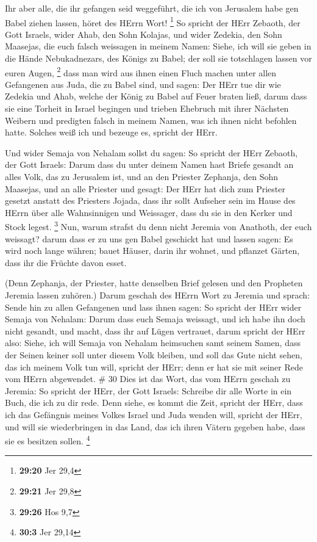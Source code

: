  Ihr aber alle, die ihr gefangen seid weggeführt, die ich
von Jerusalem habe gen Babel ziehen lassen, höret des HErrn Wort!
\footnote{\textbf{29:20} Jer 29,4}  So spricht der HErr
Zebaoth, der Gott Israels, wider Ahab, den Sohn Kolajas, und wider
Zedekia, den Sohn Maasejas, die euch falsch weissagen in meinem Namen:
Siehe, ich will sie geben in die Hände Nebukadnezars, des Königs zu
Babel; der soll sie totschlagen lassen vor euren Augen, \footnote{\textbf{29:21}
  Jer 29,8}  dass man wird aus ihnen einen Fluch machen
unter allen Gefangenen aus Juda, die zu Babel sind, und sagen: Der HErr
tue dir wie Zedekia und Ahab, welche der König zu Babel auf Feuer braten
ließ,  darum dass sie eine Torheit in Israel begingen und
trieben Ehebruch mit ihrer Nächsten Weibern und predigten falsch in
meinem Namen, was ich ihnen nicht befohlen hatte. Solches weiß ich und
bezeuge es, spricht der HErr.

 Und wider Semaja von Nehalam sollst du sagen:
 So spricht der HErr Zebaoth, der Gott Israels: Darum dass
du unter deinem Namen hast Briefe gesandt an alles Volk, das zu
Jerusalem ist, und an den Priester Zephanja, den Sohn Maasejas, und an
alle Priester und gesagt:  Der HErr hat dich zum Priester
gesetzt anstatt des Priesters Jojada, dass ihr sollt Aufseher sein im
Hause des HErrn über alle Wahnsinnigen und Weissager, dass du sie in den
Kerker und Stock legest. \footnote{\textbf{29:26} Hos 9,7} 
Nun, warum strafst du denn nicht Jeremia von Anathoth, der euch
weissagt?  darum dass er zu uns gen Babel geschickt hat und
lassen sagen: Es wird noch lange währen; bauet Häuser, darin ihr wohnet,
und pflanzet Gärten, dass ihr die Früchte davon esset.

 (Denn Zephanja, der Priester, hatte denselben Brief
gelesen und den Propheten Jeremia lassen zuhören.)  Darum
geschah des HErrn Wort zu Jeremia und sprach:  Sende hin zu
allen Gefangenen und lass ihnen sagen: So spricht der HErr wider Semaja
von Nehalam: Darum dass euch Semaja weissagt, und ich habe ihn doch
nicht gesandt, und macht, dass ihr auf Lügen vertrauet, 
darum spricht der HErr also: Siehe, ich will Semaja von Nehalam
heimsuchen samt seinem Samen, dass der Seinen keiner soll unter diesem
Volk bleiben, und soll das Gute nicht sehen, das ich meinem Volk tun
will, spricht der HErr; denn er hat sie mit seiner Rede vom HErrn
abgewendet. \# 30  Dies ist das Wort, das vom HErrn geschah
zu Jeremia:  So spricht der HErr, der Gott Israels: Schreibe
dir alle Worte in ein Buch, die ich zu dir rede.  Denn
siehe, es kommt die Zeit, spricht der HErr, dass ich das Gefängnis
meines Volkes Israel und Juda wenden will, spricht der HErr, und will
sie wiederbringen in das Land, das ich ihren Vätern gegeben habe, dass
sie es besitzen sollen. \footnote{\textbf{30:3} Jer 29,14}

